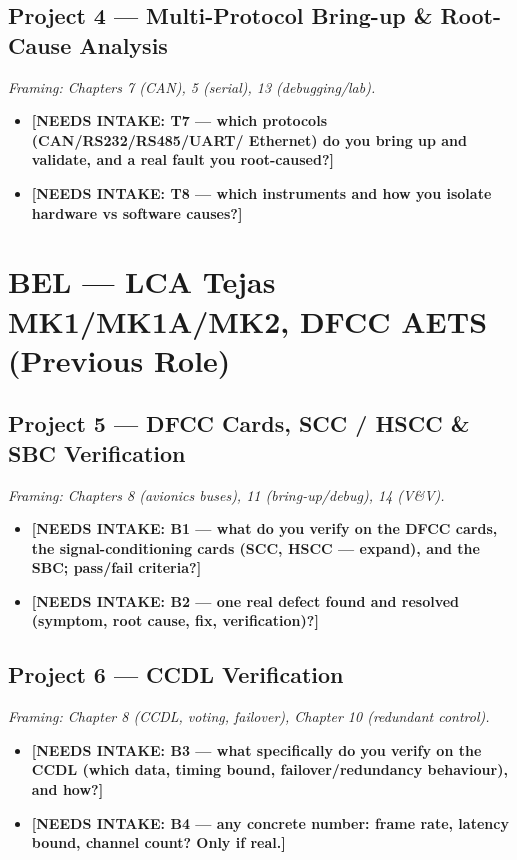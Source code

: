 \subsection{Project 4 --- Multi-Protocol Bring-up \& Root-Cause Analysis}
\emph{Framing: Chapters 7 (CAN), 5 (serial), 13 (debugging/lab).}
\begin{itemize}
\item \textbf{[NEEDS INTAKE: T7 --- which protocols (CAN/RS232/RS485/UART/
  Ethernet) do you bring up and validate, and a real fault you root-caused?]}
\item \textbf{[NEEDS INTAKE: T8 --- which instruments and how you isolate
  hardware vs software causes?]}
\end{itemize}

\section{BEL --- LCA Tejas MK1/MK1A/MK2, DFCC AETS (Previous Role)}

\subsection{Project 5 --- DFCC Cards, SCC / HSCC \& SBC Verification}
\emph{Framing: Chapters 8 (avionics buses), 11 (bring-up/debug), 14 (V\&V).}
\begin{itemize}
\item \textbf{[NEEDS INTAKE: B1 --- what do you verify on the DFCC cards, the
  signal-conditioning cards (SCC, HSCC --- expand), and the SBC; pass/fail
  criteria?]}
\item \textbf{[NEEDS INTAKE: B2 --- one real defect found and resolved (symptom,
  root cause, fix, verification)?]}
\end{itemize}

\subsection{Project 6 --- CCDL Verification}
\emph{Framing: Chapter 8 (CCDL, voting, failover), Chapter 10 (redundant control).}
\begin{itemize}
\item \textbf{[NEEDS INTAKE: B3 --- what specifically do you verify on the CCDL
  (which data, timing bound, failover/redundancy behaviour), and how?]}
\item \textbf{[NEEDS INTAKE: B4 --- any concrete number: frame rate, latency
  bound, channel count? Only if real.]}
\end{itemize}


